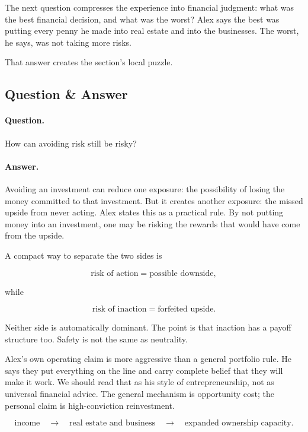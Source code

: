 The next question compresses the experience into financial judgment: what was the best financial decision, and what was the worst? Alex says the best was putting every penny he made into real estate and into the businesses. The worst, he says, was not taking more risks.

That answer creates the section's local puzzle.

\subsection{Question \& Answer}

\paragraph{Question.}
How can avoiding risk still be risky?

\paragraph{Answer.}
Avoiding an investment can reduce one exposure: the possibility of losing the money committed to that investment. But it creates another exposure: the missed upside from never acting. Alex states this as a practical rule. By not putting money into an investment, one may be risking the rewards that would have come from the upside.

A compact way to separate the two sides is

\begin{equation}
\text{risk of action}
=
\text{possible downside},
\end{equation}

while

\begin{equation}
\text{risk of inaction}
=
\text{forfeited upside}.
\end{equation}

Neither side is automatically dominant. The point is that inaction has a payoff structure too. Safety is not the same as neutrality.

Alex's own operating claim is more aggressive than a general portfolio rule. He says they put everything on the line and carry complete belief that they will make it work. We should read that as his style of entrepreneurship, not as universal financial advice. The general mechanism is opportunity cost; the personal claim is high-conviction reinvestment.

\begin{equation}
\text{income}
\quad \longrightarrow \quad
\text{real estate and business}
\quad \longrightarrow \quad
\text{expanded ownership capacity}.
\end{equation}

